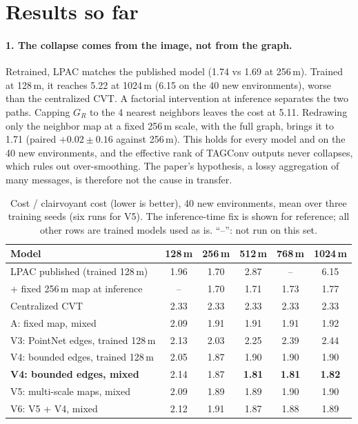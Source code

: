 \documentclass{article}
\begin{document}
\section{Results so far}
\paragraph{1. The collapse comes from the image, not from the graph.} Retrained, LPAC matches the published model (1.74 vs 1.69 at 256\,m). Trained at 128\,m, it reaches 5.22 at 1024\,m (6.15 on the 40 new environments), worse than the centralized CVT. A factorial intervention at inference separates the two paths. Capping $G_R$ to the 4 nearest neighbors leaves the cost at 5.11. Redrawing only the neighbor map at a fixed 256\,m scale, with the full graph, brings it to 1.71 (paired $+0.02\pm0.16$ against 256\,m). This holds for every model and on the 40 new environments, and the effective rank of TAGConv outputs never collapses, which rules out over-smoothing. The paper's hypothesis, a lossy aggregation of many messages, is therefore not the cause in transfer.

\begin{table}[t]
\centering
\small
\caption{Cost / clairvoyant cost (lower is better), 40 new environments, mean over three training seeds (six runs for V5). The inference-time fix is shown for reference; all other rows are trained models used as is. ``--'': not run on this set.}
\label{tab:main}
\begin{tabular}{lccccc}
\toprule
Model & 128\,m & 256\,m & 512\,m & 768\,m & 1024\,m \\
\midrule
LPAC published (trained 128\,m) & 1.96 & 1.70 & 2.87 & -- & 6.15 \\
\quad + fixed 256\,m map at inference & -- & 1.70 & 1.71 & 1.73 & 1.77 \\
Centralized CVT & 2.33 & 2.33 & 2.33 & 2.33 & 2.33 \\
\midrule
A: fixed map, mixed & 2.09 & 1.91 & 1.91 & 1.91 & 1.92 \\
V3: PointNet edges, trained 128\,m & 2.13 & 2.03 & 2.25 & 2.39 & 2.44 \\
V4: bounded edges, trained 128\,m & 2.05 & 1.87 & 1.90 & 1.90 & 1.90 \\
\textbf{V4: bounded edges, mixed} & 2.14 & 1.87 & \textbf{1.81} & \textbf{1.81} & \textbf{1.82} \\
V5: multi-scale maps, mixed & 2.09 & 1.89 & 1.89 & 1.90 & 1.90 \\
V6: V5 + V4, mixed & 2.12 & 1.91 & 1.87 & 1.88 & 1.89 \\
\bottomrule
\end{tabular}
\end{table}
\end{document}
